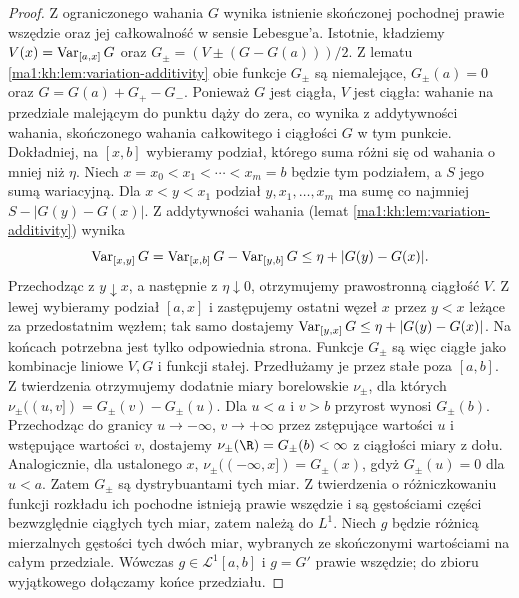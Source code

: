 \begin{proof}
Z ograniczonego wahania $G$ wynika istnienie skończonej
pochodnej prawie wszędzie oraz jej całkowalność
w sensie Lebesgue'a. Istotnie, kładziemy
$V(x)=\operatorname{Var}_{[a,x]}G$ oraz
$G_\pm=(V\pm(G-G(a)))/2$. Z lematu
\ref{ma1:kh:lem:variation-additivity} obie funkcje
$G_\pm$ są niemalejące, $G_\pm(a)=0$ oraz
$G=G(a)+G_+-G_-$. Ponieważ $G$ jest ciągła, $V$ jest ciągła: wahanie na przedziale malejącym do punktu dąży do zera, co wynika z addytywności wahania, skończonego wahania całkowitego i ciągłości $G$ w tym punkcie. Dokładniej, na $[x,b]$ wybieramy podział, którego suma różni się od wahania o mniej niż $\eta$. Niech $x=x_0<x_1<\cdots<x_m=b$ będzie tym podziałem, a $S$ jego sumą wariacyjną. Dla $x<y<x_1$ podział $y,x_1,\ldots,x_m$ ma sumę co najmniej $S-|G(y)-G(x)|$. Z addytywności wahania (lemat \ref{ma1:kh:lem:variation-additivity}) wynika
\[
 \operatorname{Var}_{[x,y]}G=\operatorname{Var}_{[x,b]}G-\operatorname{Var}_{[y,b]}G
 \le\eta+|G(y)-G(x)|.
\]
Przechodząc z $y\downarrow x$, a następnie z $\eta\downarrow0$, otrzymujemy prawostronną ciągłość $V$. Z lewej wybieramy podział $[a,x]$ i zastępujemy ostatni węzeł $x$ przez $y<x$ leżące za przedostatnim węzłem; tak samo dostajemy $\operatorname{Var}_{[y,x]}G\le\eta+|G(y)-G(x)|$. Na końcach potrzebna jest tylko odpowiednia strona. Funkcje $G_\pm$ są więc ciągłe jako kombinacje liniowe
$V,G$ i funkcji stałej. Przedłużamy je przez stałe
poza $[a,b]$. Z twierdzenia
otrzymujemy dodatnie miary borelowskie $\nu_\pm$,
dla których $\nu_\pm((u,v])=G_\pm(v)-G_\pm(u)$.
Dla $u<a$ i $v>b$ przyrost wynosi $G_\pm(b)$.
Przechodząc do granicy $u\to-\infty$, $v\to+\infty$
przez zstępujące wartości $u$ i wstępujące wartości $v$,
dostajemy $\nu_\pm(\R)=G_\pm(b)<\infty$ z ciągłości
miary z dołu. Analogicznie, dla ustalonego $x$,
$\nu_\pm((-\infty,x])=G_\pm(x)$, gdyż
$G_\pm(u)=0$ dla $u<a$. Zatem $G_\pm$ są dystrybuantami
tych miar. Z twierdzenia  o różniczkowaniu funkcji rozkładu ich pochodne istnieją prawie wszędzie i są gęstościami części bezwzględnie ciągłych tych miar, zatem należą do $L^1$. Niech $g$ będzie różnicą mierzalnych gęstości tych dwóch miar, wybranych ze skończonymi wartościami na całym przedziale. Wówczas $g\in\mathcal L^1[a,b]$ i $g=G'$ prawie wszędzie; do zbioru wyjątkowego dołączamy końce przedziału.


\end{proof}
